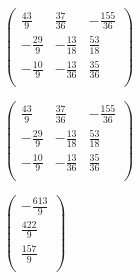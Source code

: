 \documentclass{article}
\begin{document}
\begin{doublespace}
\noindent\(\left(
\begin{array}{ccc}
 \frac{43}{9} & \frac{37}{36} & -\frac{155}{36} \\
 -\frac{29}{9} & -\frac{13}{18} & \frac{53}{18} \\
 -\frac{10}{9} & -\frac{13}{36} & \frac{35}{36} \\
\end{array}
\right)\)
\end{doublespace}
\noindent\(\left(
\begin{array}{ccc}
 \frac{43}{9} & \frac{37}{36} & -\frac{155}{36} \\
 -\frac{29}{9} & -\frac{13}{18} & \frac{53}{18} \\
 -\frac{10}{9} & -\frac{13}{36} & \frac{35}{36} \\
\end{array}
\right)\)

\begin{doublespace}
\noindent\(\left(
\begin{array}{c}
 -\frac{613}{9} \\
 \frac{422}{9} \\
 \frac{157}{9} \\
\end{array}
\right)\)
\end{doublespace}
\end{document}
